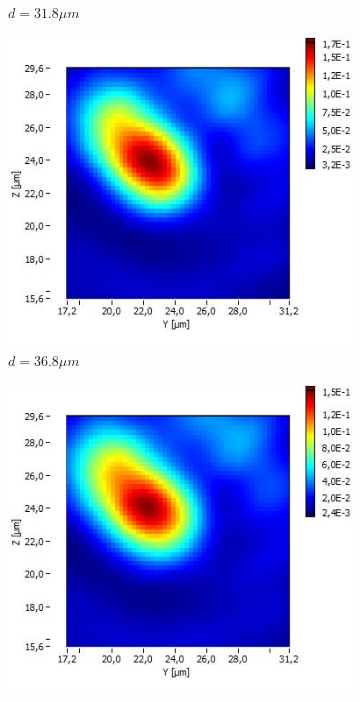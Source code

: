 \documentclass[a4paper,11pt]{article}
\begin{document}
\begin{figure}[htb]
\begin{subfigure}[b]{.20\linewidth}
    \caption{$d=31.8\mu m$}
  \end{subfigure}
  \begin{subfigure}[b]{.20\linewidth}
    \centering
    \includegraphics[width=\textwidth]{Fibre5/scan_031_g1.jpg}
    \caption{$d=36.8\mu m$}
  \end{subfigure}
  \begin{subfigure}[b]{.20\linewidth}
    \centering
    \includegraphics[width=\textwidth]{Fibre5/scan_032_g1.jpg}

\end{subfigure}
\end{figure}
\end{document}
